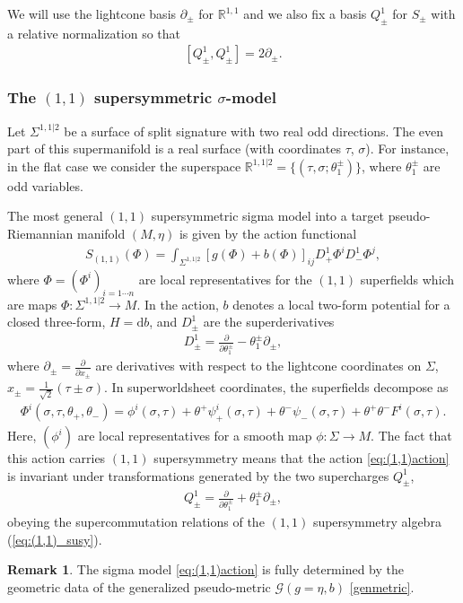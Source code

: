 \documentclass[letterpaper,12pt]{article}
\newcommand{\GG}{\mathcal{G}}
\newcommand{\RR}{\mathbb{R}}
\newcommand{\p}{\partial}
\newcommand{\rd}{\mathrm{d}}
\theoremstyle{definition}
\newtheorem{remark}[theorem]{Remark}
\theoremstyle{remark}
\theoremstyle{examples}
\begin{document}
We will use the lightcone basis $\p_{\pm}$ for $\RR^{1,1}$ and we also fix a basis $Q_\pm^1$ for $S_{\pm}$ with a relative normalization so that
\begin{align}\label{eq:(1,1)_susy}
[Q^1_\pm,Q^1_\pm] = 2\p_\pm.
\end{align}

\subsubsection{The $(1,1)$ supersymmetric $\sigma$-model} 

Let $\Sigma^{1,1|2}$ be a surface of split signature with two real odd directions. 
The even part of this supermanifold is a real surface (with coordinates $\tau$, $\sigma$).
For instance, in the flat case we consider the superspace $\RR^{1,1|2} = \{(\tau,\sigma ; \theta_1^{\pm})\}$, where $\theta_1^{\pm}$ are odd variables. 

The most general $(1,1)$ supersymmetric sigma model into a target pseudo-Riemannian manifold $(M,\eta)$ is given by the action functional
\begin{align}\label{eq:(1,1)action}
S_{(1,1)}(\Phi)=\int_{\Sigma^{1,1|2}} [g(\Phi)+b(\Phi)]_{ij}D^1_+\Phi^iD^1_-\Phi^j,
\end{align}
where $\Phi=(\Phi^i)_{i=1\cdots n}$ are local representatives for the $(1,1)$ {superfields} which are maps $\Phi: \Sigma^{1,1|2} \rightarrow M$.
In the action, $b$ denotes a local two-form potential for a closed three-form, $H=\rd b$, and $D^1_\pm$ are the superderivatives
\begin{align}\label{eq:D1}
D^1_\pm=\frac{\p}{\p \theta_1^\pm}-\theta_1^\pm \p_\pm,
\end{align}
where $\p_\pm=\frac{\p}{\p x_\pm}$ are derivatives with respect to the lightcone coordinates on $\Sigma$, $x_\pm= \frac{1}{\sqrt{2}} (\tau\pm\sigma)$. In superworldsheet coordinates, the superfields decompose as
\begin{align}\label{fields_(1,1)}
\Phi^i(\sigma,\tau,\theta_+,\theta_-)=\phi^i(\sigma,\tau)+\theta^+\psi^i_+(\sigma,\tau)+\theta^-\psi_-(\sigma,\tau)+\theta^+\theta^-F^i(\sigma,\tau).
\end{align}
Here, $(\phi^i)$ are local representatives for a smooth map $\phi: \Sigma \rightarrow M$. The fact that this action carries $(1,1)$ supersymmetry means that the action \eqref{eq:(1,1)action} is invariant under transformations generated by the two {supercharges} $Q^1_\pm$, 
\begin{align}\label{eq:Q1}
Q^1_\pm=\frac{\p}{\p \theta_1^\pm}+\theta_1^\pm \p_\pm,
\end{align}
obeying the supercommutation relations of the $(1,1)$ supersymmetry algebra (\ref{eq:(1,1)_susy}). 
\begin{remark}
The sigma model \eqref{eq:(1,1)action} is fully determined by the geometric data of the generalized pseudo-metric $\GG(g=\eta,b)$ \eqref{genmetric}.
\end{remark}
\end{document}
